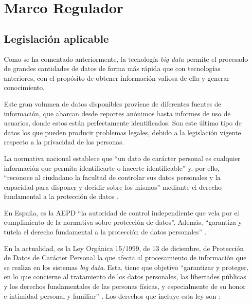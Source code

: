 \chapter{Marco Regulador \label{sec:MarcoRegulador}}
\section{Legislación aplicable}
Como se ha comentado anteriormente, la tecnología \textit{big data} permite el procesado de grandes cantidades de datos de forma más rápida que con tecnologías anteriores, con el propósito de obtener información valiosa de ella y generar conocimiento.

Este gran volumen de datos disponibles proviene de diferentes fuentes de información, que abarcan desde reportes anónimos hasta informes de uso de usuarios, donde estos están perfectamente identificados. Son este último tipo de datos los que pueden producir problemas legales, debido a la legislación vigente respecto a la privacidad de las personas.

La normativa nacional establece que ``un dato de carácter personal es cualquier información que permita identificarte o hacerte identificable'' y, por ello, ``reconoce al ciudadano la facultad de controlar sus datos personales y la capacidad para disponer y decidir sobre los mismos'' mediante el derecho fundamental a la protección de datos \cite{aepd}.

En España, es la \gls{AEPD} ``la autoridad de control independiente que vela por el cumplimiento de la normativa sobre protección de datos''. Además, ``garantiza y tutela el derecho fundamental a la protección de datos personales'' \cite{aepd}.

En la actualidad, es la Ley Orgánica 15/1999, de 13 de diciembre, de Protección de Datos de Carácter Personal \cite{leyPrivacidad} la que afecta al procesamiento de información que se realiza en los sistemas \textit{big data}. Esta, tiene que objetivo ``garantizar
y  proteger,  en  lo  que  concierne  al  tratamiento  de  los
datos personales, las libertades públicas y los derechos
fundamentales de las personas físicas, y especialmente
de su honor e intimidad personal y familiar'' \cite{leyPrivacidad}. Los derechos que incluye esta ley son \cite{derechosCiu}:

